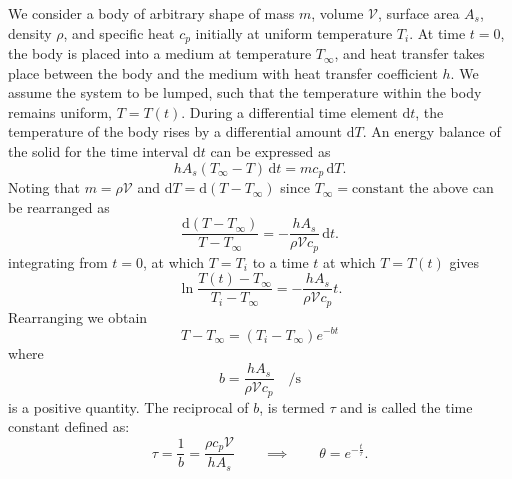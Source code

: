We consider a body of arbitrary shape of mass $m$, volume $\mathscr{V}$, surface area $A_s$, density $\rho$, and specific heat $c_p$ initially at uniform temperature $T_i$.
At time $t = 0$, the body is placed into a medium at temperature $T_{\infty}$, and heat transfer takes place between the body and the medium with heat transfer coefficient $h$.
We assume the system to be lumped, such that the temperature within the body remains uniform, $T = T(t)$.
During a differential time element $\mathrm{d}t$, the temperature of the body rises by a differential amount $\mathrm{d}T$.
An energy balance of the solid for the time interval $\mathrm{d}t$ can be expressed as
\begin{equation*}
  h A_s \left( T_{\infty}-T \right) \, \mathrm{d}t  = m c_p \, \mathrm{d}T
.\end{equation*}
Noting that $m = \rho \mathscr{V}$ and $\mathrm{d}T = \mathrm{d}(T-T_{\infty})$ since $T_{\infty} = \text{constant}$ the above can be rearranged as
\begin{equation*}
  \frac{\mathrm{d}(T-T_{\infty})}{T-T_{\infty}} = - \frac{h A_s}{\rho \mathscr{V} c_p} \, \mathrm{d}t
.\end{equation*}
integrating from $t = 0$, at which $T = T_i$ to a time $t$ at which $T = T(t)$ gives
\begin{equation*}
  \ln \frac{T(t) - T_{\infty}}{T_i - T_{\infty}} = - \frac{h A_s}{\rho \mathscr{V}c_p}t
.\end{equation*}
Rearranging we obtain
\begin{equation} \label{eq:lumpedtemp}
  T - T_{\infty} = (T_i - T_{\infty}) e^{-bt}
\end{equation}
where
\begin{equation*}
  b = \frac{h A_s}{\rho \mathscr{V} c_p} \quad \unit{\per\s}
\end{equation*}
is a positive quantity.
The reciprocal of $b$, is termed $\tau$ and is called the time constant defined as:
\begin{equation*}
  \tau = \frac{1}{b} = \frac{\rho c_p \mathscr{V}}{h A_s} \qquad \implies \qquad \theta = e^{- \frac{t}{\tau}}
.\end{equation*}


